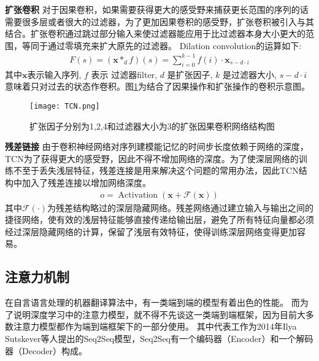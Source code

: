 \textbf{扩张卷积}
对于因果卷积，如果需要获得更大的感受野来捕获更长范围的序列的话需要很多层或者很大的过滤器，为了更加因果卷积的感受野，扩张卷积被引入与其结合。扩张卷积通过跳过部分输入来使过滤器能应用于比过滤器本身大小更大的范围，等同于通过零填充来扩大原先的过滤器。
Dilation convolution的运算如下:
\begin{align}
  F(s)=\left(\mathbf{x} *_{d} f\right)(s)=\sum_{i=0}^{k-1} f(i) \cdot \mathbf{x}_{s-d \cdot i}
\end{align}
其中$\mathbf {x}$表示输入序列, $f$ 表示 过滤器filter, $d$ 是扩张因子,%
 $k$ 是过滤器大小,  $s-d\cdot i$意味着只对过去的状态作卷积。图\ref{fig:TCN}为结合了因果操作和扩张操作的卷积示意图。
\begin{figure}[htb]
  \centering
  \texttt{[image: TCN.png]}\\
  \caption{扩张因子分别为1,2,4和过滤器大小为3的扩张因果卷积网络结构图}
  \label{fig:TCN}
\end{figure}
\textbf{残差链接}
由于卷积神经网络对序列建模能记忆的时间步长度依赖于网络的深度，TCN为了获得更大的感受野，因此不得不增加网络的深度。为了使深层网络的训练不至于丢失浅层特征，残差连接是用来解决这个问题的常用办法，因此TCN结构中加入了残差连接以增加网络深度。
\begin{align}
  o=\operatorname{Activation}(\mathbf{x}+\mathcal{F}(\mathbf{x}))
\end{align}
其中$\mathcal{F}(\cdot)$为残差结构略过的深层隐藏网络。残差网络通过建立输入与输出之间的捷径网络，使有效的浅层特征能够直接传递给输出层，避免了所有特征向量都必须经过深层隐藏网络的计算，保留了浅层有效特征，使得训练深层网络变得更加容易。



\subsection{注意力机制}
在自言语言处理的机器翻译算法中，有一类端到端的模型有着出色的性能。
而为了说明深度学习中的注意力模型，就不得不先谈这一类端到端框架，因为目前大多数注意力模型都作为端到端框架下的一部分使用。
其中代表工作为2014年Ilya Sutskever等人提出的Seq2Seq模型，Seq2Seq有一个编码器（Encoder）和一个解码器（Decoder）构成。

